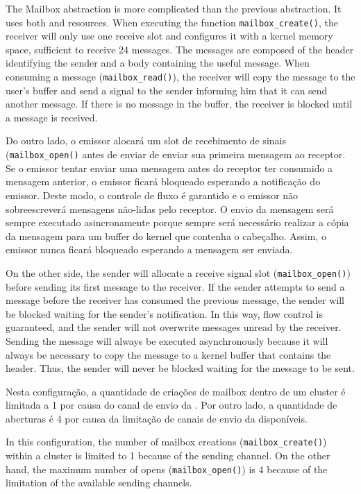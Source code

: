 		The Mailbox abstraction is more complicated than the previous abstraction.
		It uses both \dnoc and \cnoc resources. When executing the function \texttt{mailbox\_create()},
		the receiver will only use one \dnoc receive slot and configures it
		with a kernel memory space, sufficient to receive 24 messages.
		The messages are composed of the header identifying the sender
		and a body containing the useful message.
		When consuming a message (\texttt{mailbox\_read()}), the receiver
		will copy the message to the user's buffer and send a signal
		to the sender informing him that it can send another message.
		If there is no message in the buffer, the receiver is blocked
		until a message is received.

		Do outro lado, o emissor alocará um slot de recebimento de sinais
		(\texttt{mailbox\_open()} antes de enviar de enviar sua primeira mensagem ao receptor.
		Se o emissor tentar enviar uma mensagem antes do receptor ter consumido
		a mensagem anterior, o emissor ficará bloqueado esperando a notificação
		do emissor.
		Deste modo, o controle de fluxo é garantido e o emissor não
		sobreescreverá mensagens não-lidas pelo receptor.
		O envio da mensagem será sempre executado asincronamente porque
		sempre será necessário realizar a cópia da mensagem para um
		buffer do kernel que contenha o cabeçalho.
		Assim, o emissor nunca ficará bloqueado esperando a mensagem ser enviada.

		On the other side, the sender will allocate a receive signal slot (\texttt{mailbox\_open()})
		before sending its first message to the receiver.
		If the sender attempts to send a message before the receiver has consumed
		the previous message, the sender will be blocked waiting for the sender's notification.
		In this way, flow control is guaranteed, and the sender will not overwrite
		messages unread by the receiver.
		Sending the message will always be executed asynchronously
		because it will always be necessary to copy the message to
		a kernel buffer that contains the header.
		Thus, the sender will never be blocked waiting for the message to be sent.

		Nesta configuração, a quantidade de criações  de
		mailbox dentro de um cluster é limitada a 1 por causa do canal de envio da \cnoc.
		Por outro lado, a quantidade de aberturas  é 4 por
		causa da limitação de canais de envio da \dnoc disponíveis.

		In this configuration, the number of mailbox creations (\texttt{mailbox\_create()})
		within a cluster is limited to 1 because of the \cnoc sending channel.
		On the other hand, the maximum number of opens (\texttt{mailbox\_open()}) is
		4 because of the limitation of the available \dnoc sending channels.


